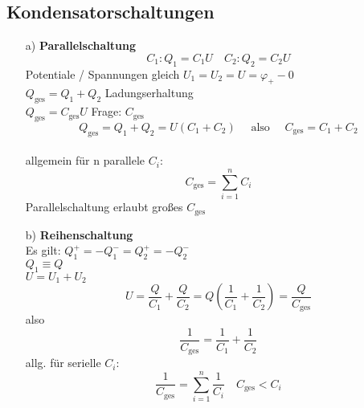 \documentclass[titlepage,12pt,a4paper,ngerman]{report}
\newcommand{\tx}[1]{\textrm{#1}}
\begin{document}
\subsection{Kondensatorschaltungen}
\begin{itemize}
\item[a)] \textbf{Parallelschaltung}
$$C_1:  Q_1 = C_1 U \quad C_2: Q_2 = C_2 U$$
Potentiale / Spannungen gleich $U_1 = U_2 = U = \varphi_+-0$\\
$Q_{\tx{ges}} = Q_1 + Q_2$ Ladungserhaltung\\
$Q_{\tx{ges}} = C_{\tx{ges}} U $ Frage: $C_{\tx{ges}}$\\
$$Q_{\tx{ges}} = Q_1 + Q_2 = U(C_1 + C_2) \quad \tx{ also } \quad C_{\tx{ges}} = C_1 + C_2$$\\
allgemein für n parallele $C_i$: 
$$C_{\tx{ges}} = \sum_{i=1}^{n}C_i$$
Parallelschaltung erlaubt großes $C_{\tx{ges}}$\\
\item[b)] \textbf{Reihenschaltung}\\
Es gilt: $ Q^+_1 = - Q_1^- = Q_2^+ = -Q_2^-$\\
$Q_1 \equiv Q$\\
$ U = U_1 + U_2$
$$ U = \frac{Q}{C_1} + \frac{Q}{C_2} = Q(\frac{1}{C_1} + \frac{1}{C_2}) = \frac{Q}{C_{\tx{ges}}}$$
also $$ \frac{1}{C_{\tx{ges}}} = \frac{1}{C_1} + \frac{1}{C_2}$$
allg. für serielle $C_i$:
$$ \frac{1}{C_{\tx{ges}}} = \sum^n_{i=1} \frac{1}{C_i} \quad C_{\tx{ges}} < C_i$$
\end{itemize}
\end{document}

